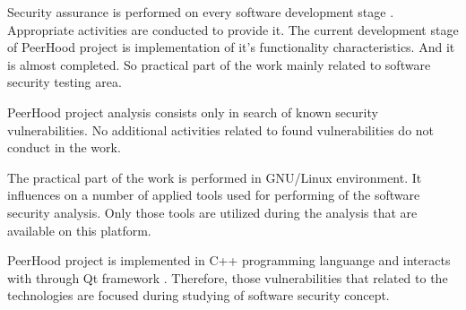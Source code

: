 %
Security assurance is performed on every software development stage . 
%
Appropriate activities are conducted to provide it. 
%
The current development stage of PeerHood project is implementation of it's functionality characteristics. 
%
And it is almost completed. 
%
So \The practical part of the work mainly related to software security testing area. 

%
PeerHood project analysis consists only in search of known security vulnerabilities. 
%
No additional activities related to \The found vulnerabilities do not conduct in the work. 

%
The practical part of the work is performed in GNU/Linux  environment. 
%
It influences on a number of applied tools used for performing of the software security analysis. 
%
Only those tools are utilized during the analysis that are available on this platform. 

%
PeerHood project is implemented in C++  programming languange and interacts with  through Qt framework . 
%
Therefore, those vulnerabilities that related to the technologies are focused during studying of software security concept. 